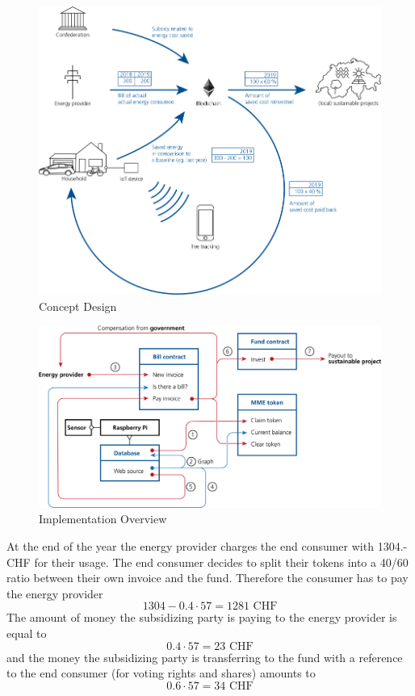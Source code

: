 \documentclass[11pt]{article}
\begin{document}
\begin{figure}
	\begin{center}
		\includegraphics[scale=1.3]{../presentation/concept.png}
		\caption{Concept Design}
		\label{img_concept}
	\end{center}
\end{figure}
\begin{figure}[ht]
	\begin{center}
		\includegraphics[scale=1.3]{../presentation/implementation.png}
		\caption{Implementation Overview}
		\label{img_impl}
	\end{center}
\end{figure}

\noindent
At the end of the year the energy provider charges the end consumer with 1304.- CHF for their usage. The end consumer decides to split their tokens into a 40/60 ratio between their own invoice and the fund. Therefore the consumer has to pay the energy provider
\begin{equation}
1304-0.4\cdot57=1281  \textrm{ CHF}
\end{equation}
The amount of money the subsidizing party is paying to the energy provider is equal to
\begin{equation}
0.4\cdot57=23 \textrm{ CHF}
\end{equation}
and the money the subsidizing party is transferring to the fund with a reference to the end consumer (for voting rights and shares) amounts to
\begin{equation}
0.6\cdot57=34 \textrm{ CHF}
\end{equation}
\newpage
\end{document}
